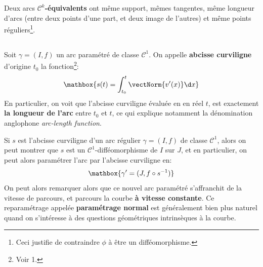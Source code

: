 Deux arcs \(\mathcal{C}^k\)\textbf{-équivalents} ont même support, mêmes tangentes, même longueur d'arcs (entre deux points d'une part, et deux image de l'autres) et même points réguliers\footnote[2]{Ceci justifie de contraindre \(\phi\) à être un difféomorphisme.}.


\subsection*{}
Soit \(\gamma = (I, f)\) un arc paramétré de classe \(\mathcal{C}^1\). On appelle \textbf{abcisse curviligne} d'origine \(t_0\) la fonction\footnote[3]{Voir 1.}:
\[
   \mathbox{s(t) = \int_{t_0}^{t} \vectNorm{v'(x)} \d x}  
\]
En particulier, on voit que l'abcisse curviligne évaluée en en réel \(t\), est exactement \textbf{la longueur de l'arc} entre \(t_0\) et \(t\), ce qui explique notamment la dénomination anglophone \textit{arc-length function}.\<

Si \(s\) est l'abcisse curviligne d'un arc régulier \(\gamma = (I, f)\) de classe \(\mathcal{C}^1\), alors on peut montrer que \(s\) est un \(\mathcal{C}^1\)-difféomorphisme de \(I\) sur \(J\), et en particulier, on peut alors paramétrer l'arc par l'abcisse curviligne en:
\[
   \mathbox{\gamma' = (J, f \circ s^{-1})}   
\]
On peut alors remarquer alors que ce nouvel arc paramétré s'affranchit de la vitesse de parcours, et parcours la courbe \textbf{à vitesse constante}. Ce reparamétrage appelée \textbf{paramétrage normal} est généralement bien plus naturel quand on s'intéresse à des questions géométriques intrinsèques à la courbe.